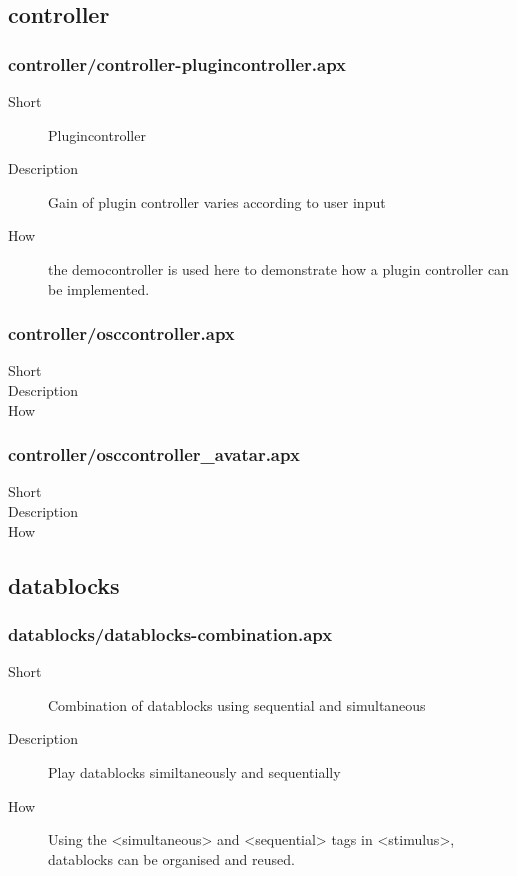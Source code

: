 \subsection{controller}
\subsubsection{controller/controller-plugincontroller.apx}
\begin{description}
\item[Short] 
 Plugincontroller
\item[Description] 
 Gain of plugin controller varies according to user input
\item[How] 
 the democontroller is used here to demonstrate how a plugin controller can be implemented.
\end{description}

\subsubsection{controller/osccontroller.apx}
\begin{description}
\item[Short] 
\item[Description] 
\item[How] 
\end{description}

\subsubsection{controller/osccontroller\_avatar.apx}
\begin{description}
\item[Short] 
\item[Description] 
\item[How] 
\end{description}

\subsection{datablocks}
\subsubsection{datablocks/datablocks-combination.apx}
\begin{description}
\item[Short] 
 Combination of datablocks using sequential and simultaneous
\item[Description] 
  Play datablocks similtaneously and sequentially
\item[How] 
 Using the \textless{}simultaneous\textgreater{} and \textless{}sequential\textgreater{} tags in \textless{}stimulus\textgreater{}, datablocks can be organised and reused.
\end{description}

